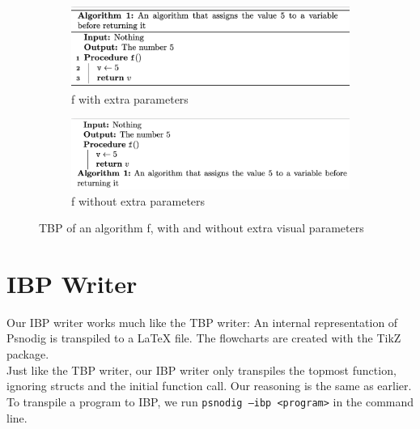 \begin{figure}[ht]
\centering
\begin{subfigure}{.5\textwidth}
  \centering
  \includegraphics[width=.9\linewidth]{assets/return5pretty.png}
  \caption{f with extra parameters}
  \label{fig:sub1}
\end{subfigure}%
\begin{subfigure}{.5\textwidth}
  \centering
  \includegraphics[width=.9\linewidth]{assets/return5ugly.png}
  \caption{f without extra parameters}
  \label{fig:sub2}
\end{subfigure}
\caption{TBP of an algorithm f, with and without extra visual parameters}
\label{fig:test}
\end{figure}




\section{IBP Writer}

Our IBP writer works much like the TBP writer: An internal representation of Psnodig is transpiled to a LaTeX file. The flowcharts are created with the TikZ package. \\

Just like the TBP writer, our IBP writer only transpiles the topmost function, ignoring structs and the initial function call. Our reasoning is the same as earlier. To transpile a program to IBP, we run \texttt{psnodig --ibp <program>} in the command line.

